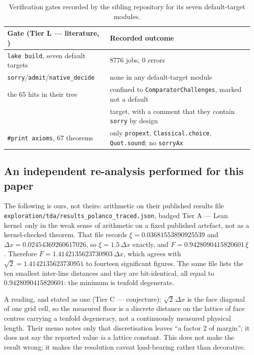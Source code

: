 \documentclass[11pt,a4paper]{article}
\theoremstyle{remark}
\newcommand{\tierA}{\colorbox{green!15}{\textsf{\scriptsize Tier A --- Lean kernel}}}
\newcommand{\tierL}{\colorbox{blue!10}{\textsf{\scriptsize Tier L --- literature}}}
\newcommand{\tierC}{\colorbox{orange!15}{\textsf{\scriptsize Tier C --- conjecture}}}
\newcommand{\lean}[1]{\texttt{#1}}
\begin{document}
\begin{table}[h]
\centering
\begin{tabular}{ll}
\hline
Gate (\tierL, \cite{QuantumFluids2026}) & Recorded outcome \\
\hline
\texttt{lake build}, seven default targets & $8776$ jobs, $0$ errors \\
\texttt{sorry}/\texttt{admit}/\texttt{native\_decide} & none in any default-target module \\
the $65$ hits in their tree & confined to \texttt{ComparatorChallenges}, marked not a default \\
 & target, with a comment that they contain \texttt{sorry} by design \\
\texttt{\#print axioms}, $67$ theorems & only \texttt{propext}, \texttt{Classical.choice}, \texttt{Quot.sound}; no \texttt{sorryAx} \\
\hline
\end{tabular}
\caption{Verification gates recorded by the sibling repository for its seven default-target modules.}
\label{tab:tdagates}
\end{table}

\subsection*{An independent re-analysis performed for this paper}

The following is ours, not theirs: arithmetic on their published results file \lean{exploration/tda/results\_polanco\_traced.json}, badged \tierA\ only in the weak sense of arithmetic on a fixed published artefact, not as a kernel-checked theorem. That file records $\xi = 0.03681553890925539$ and $\Delta x = 0.02454369260617026$, so $\xi = 1.5\,\Delta x$ exactly, and $F = 0.9428090415820601\,\xi$. Therefore $F = 1.4142135623730903\,\Delta x$, which agrees with $\sqrt{2} = 1.4142135623730951$ to fourteen significant figures. The same file lists the ten smallest inter-line distances and they are bit-identical, all equal to $0.9428090415820601$: the minimum is tenfold degenerate.

A reading, and stated as one (\tierC): $\sqrt{2}\,\Delta x$ is the face diagonal of one grid cell, so the measured floor is a discrete distance on the lattice of face centres carrying a tenfold degeneracy, not a continuously measured physical length. Their memo notes only that discretisation leaves ``a factor 2 of margin''; it does not say the reported value \emph{is} a lattice constant. This does not make the result wrong; it makes the resolution caveat load-bearing rather than decorative.
\end{document}
